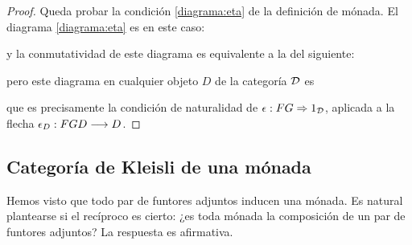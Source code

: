 \begin{proof}
  Queda probar la condición \eqref{diagrama:eta} de la definición
  de mónada. El diagrama \eqref{diagrama:eta} es en este caso:
  \begin{center}
  \end{center}
  y la conmutatividad de este diagrama es
  equivalente a la del siguiente:
  \begin{center}
  \end{center}
  pero este diagrama en cualquier objeto $D$ de la categoría $\mathcal{D}$ es
  \begin{center}
  \end{center}
  que es precisamente la condición de naturalidad de
  $\epsilon : FG\Rightarrow 1_{\mathcal{D}}$, aplicada a la flecha
  $\epsilon_D : FGD\longrightarrow D$.
\end{proof}


\subsection{Categoría de Kleisli de una mónada}
Hemos visto que todo par de funtores adjuntos inducen una mónada.
Es natural plantearse si el recíproco es cierto: ¿es toda mónada
la composición de un par de funtores adjuntos?
La respuesta es afirmativa.

